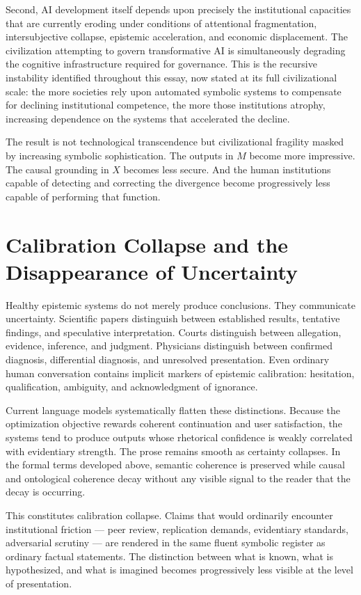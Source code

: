 \documentclass[12pt, a4paper]{article}
\theoremstyle{remark}
\begin{document}
Second, AI development itself depends upon precisely the institutional capacities that are currently eroding under conditions of attentional fragmentation, intersubjective collapse, epistemic acceleration, and economic displacement. The civilization attempting to govern transformative AI is simultaneously degrading the cognitive infrastructure required for governance. This is the recursive instability identified throughout this essay, now stated at its full civilizational scale: the more societies rely upon automated symbolic systems to compensate for declining institutional competence, the more those institutions atrophy, increasing dependence on the systems that accelerated the decline.

The result is not technological transcendence but civilizational fragility masked by increasing symbolic sophistication. The outputs in $M$ become more impressive. The causal grounding in $X$ becomes less secure. And the human institutions capable of detecting and correcting the divergence become progressively less capable of performing that function.

\section{Calibration Collapse and the Disappearance of Uncertainty}

Healthy epistemic systems do not merely produce conclusions. They communicate uncertainty. Scientific papers distinguish between established results, tentative findings, and speculative interpretation. Courts distinguish between allegation, evidence, inference, and judgment. Physicians distinguish between confirmed diagnosis, differential diagnosis, and unresolved presentation. Even ordinary human conversation contains implicit markers of epistemic calibration: hesitation, qualification, ambiguity, and acknowledgment of ignorance.

Current language models systematically flatten these distinctions. Because the optimization objective rewards coherent continuation and user satisfaction, the systems tend to produce outputs whose rhetorical confidence is weakly correlated with evidentiary strength. The prose remains smooth as certainty collapses. In the formal terms developed above, semantic coherence is preserved while causal and ontological coherence decay without any visible signal to the reader that the decay is occurring.

This constitutes calibration collapse. Claims that would ordinarily encounter institutional friction --- peer review, replication demands, evidentiary standards, adversarial scrutiny --- are rendered in the same fluent symbolic register as ordinary factual statements. The distinction between what is known, what is hypothesized, and what is imagined becomes progressively less visible at the level of presentation.
\end{document}

